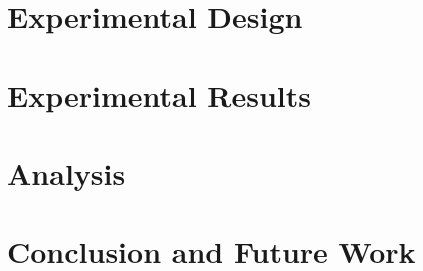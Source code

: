 \documentclass{article}
\begin{document}
\section{Experimental Design}

\section{Experimental Results}

\section{Analysis}

\section{Conclusion and Future Work}

\begin{footnotesize}


\end{footnotesize}%
\end{document}
